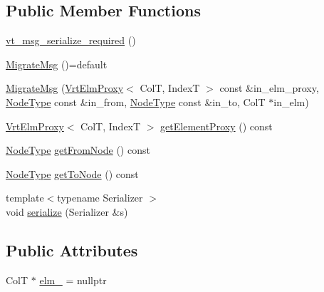 \subsection*{Public Member Functions}
\begin{DoxyCompactItemize}
\item 
\hyperlink{structvt_1_1vrt_1_1collection_1_1_migrate_msg_ad6dcb8f2f1555556800b50195d219c19}{vt\+\_\+msg\+\_\+serialize\+\_\+required} ()
\item 
\hyperlink{structvt_1_1vrt_1_1collection_1_1_migrate_msg_a0b41c5d241e067dadb4648653f9909bc}{Migrate\+Msg} ()=default
\item 
\hyperlink{structvt_1_1vrt_1_1collection_1_1_migrate_msg_a6246b857036c6e3b4ed3d62ed63eba63}{Migrate\+Msg} (\hyperlink{structvt_1_1vrt_1_1collection_1_1_vrt_elm_proxy}{Vrt\+Elm\+Proxy}$<$ ColT, IndexT $>$ const \&in\+\_\+elm\+\_\+proxy, \hyperlink{namespacevt_a866da9d0efc19c0a1ce79e9e492f47e2}{Node\+Type} const \&in\+\_\+from, \hyperlink{namespacevt_a866da9d0efc19c0a1ce79e9e492f47e2}{Node\+Type} const \&in\+\_\+to, ColT $\ast$in\+\_\+elm)
\item 
\hyperlink{structvt_1_1vrt_1_1collection_1_1_vrt_elm_proxy}{Vrt\+Elm\+Proxy}$<$ ColT, IndexT $>$ \hyperlink{structvt_1_1vrt_1_1collection_1_1_migrate_msg_a6a8d4f819ebe556df1f3533bfa0e21f2}{get\+Element\+Proxy} () const
\item 
\hyperlink{namespacevt_a866da9d0efc19c0a1ce79e9e492f47e2}{Node\+Type} \hyperlink{structvt_1_1vrt_1_1collection_1_1_migrate_msg_ab3b156dd31382eab3551024ee3668fad}{get\+From\+Node} () const
\item 
\hyperlink{namespacevt_a866da9d0efc19c0a1ce79e9e492f47e2}{Node\+Type} \hyperlink{structvt_1_1vrt_1_1collection_1_1_migrate_msg_a24d93f9c73876f57d51a83f53a6e6796}{get\+To\+Node} () const
\item 
{\footnotesize template$<$typename Serializer $>$ }\\void \hyperlink{structvt_1_1vrt_1_1collection_1_1_migrate_msg_afd275449bca23638c2d8139fff35d39f}{serialize} (Serializer \&s)
\end{DoxyCompactItemize}
\subsection*{Public Attributes}
\begin{DoxyCompactItemize}
\item 
ColT $\ast$ \hyperlink{structvt_1_1vrt_1_1collection_1_1_migrate_msg_aa074fd362c469f1a0aae30d1cf9888bf}{elm\+\_\+} = nullptr
\end{DoxyCompactItemize}
